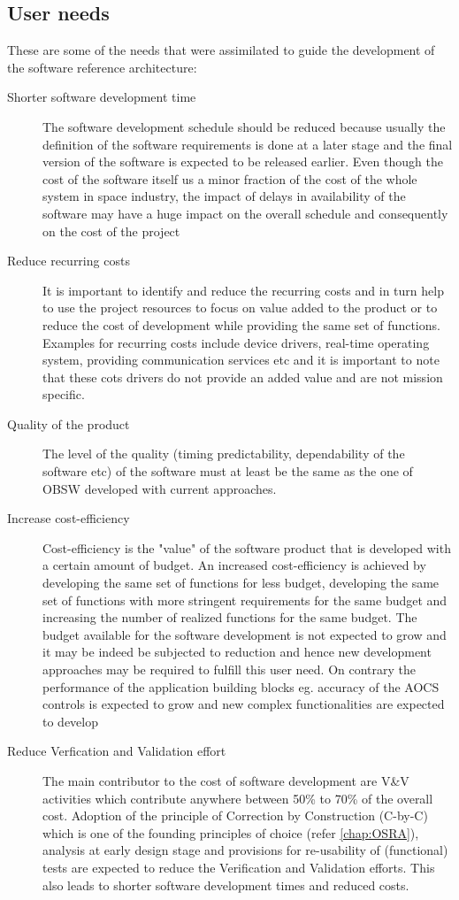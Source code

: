 \subsection*{User needs}
These are some of the needs that were assimilated to guide the development of the software reference architecture:
\begin{description}
\item [Shorter software development time] The software development schedule should be reduced because usually the definition of the software requirements is done at a later stage and the final version of the software is expected to be released earlier. Even though the cost of the software itself us a minor fraction of the cost of the whole system in space industry, the impact of delays in availability of the software may have a huge impact on the overall schedule and consequently on the cost of the project
\item [Reduce recurring costs] It is important to identify and reduce the recurring costs and in turn help to use the project resources to focus on value added to the product or to reduce the cost of development while providing the same set of functions. Examples for recurring costs include device drivers, real-time operating system, providing communication services etc and it is important to note that these cots drivers do not provide an added value and are not mission specific.
\item [Quality of the product] The level of the quality (timing predictability, dependability of the software etc) of the software must at least be the same as the one of OBSW developed with current approaches.
\item [Increase cost-efficiency] Cost-efficiency is the "value" of the software product that is developed with a certain amount of budget. An increased cost-efficiency is achieved by developing the same set of functions for less budget, developing the same set of functions with more stringent requirements for the same budget and increasing the number of realized functions for the same budget. The budget available for the software development is not expected to grow and it may be indeed be subjected to reduction and hence new development approaches may be required to fulfill this user need. On contrary the performance of the application building blocks eg. accuracy of the AOCS controls is expected to grow and new complex functionalities are expected to develop
\item [Reduce Verfication and Validation effort] The main contributor to the cost of software development are V\&V activities which contribute anywhere between 50\% to 70\% of the overall cost. Adoption of the principle of Correction by Construction (C-by-C) which is one of the founding principles of choice (refer \cref{chap:OSRA}), analysis at early design stage and provisions for re-usability of (functional) tests are expected to reduce the Verification and Validation efforts. This also leads to shorter software development times and reduced costs. 

\end{description}

